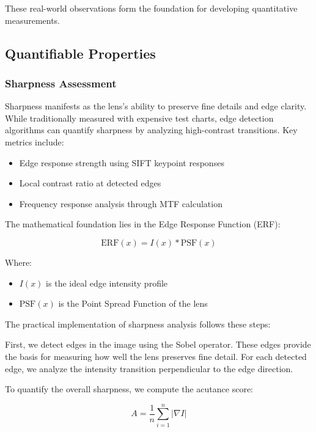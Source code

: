 These real-world observations form the foundation for developing quantitative measurements.

\subsection{Quantifiable Properties}

\subsubsection{Sharpness Assessment}
Sharpness manifests as the lens's ability to preserve fine details and edge clarity. While traditionally measured with expensive test charts, edge detection algorithms can quantify sharpness by analyzing high-contrast transitions. Key metrics include:

\begin{itemize}
    \item Edge response strength using SIFT keypoint responses
    \item Local contrast ratio at detected edges
    \item Frequency response analysis through MTF calculation
\end{itemize}

The mathematical foundation lies in the Edge Response Function (ERF):

\begin{equation}
\text{ERF}(x) = I(x) * \text{PSF}(x)
\end{equation}

Where:
\begin{itemize}
    \item \( I(x) \) is the ideal edge intensity profile
    \item \( \text{PSF}(x) \) is the Point Spread Function of the lens
\end{itemize}

The practical implementation of sharpness analysis follows these steps:

First, we detect edges in the image using the Sobel operator. These edges provide the basis for measuring how well the lens preserves fine detail. For each detected edge, we analyze the intensity transition perpendicular to the edge direction.

To quantify the overall sharpness, we compute the acutance score:

\begin{equation}
A = \frac{1}{n} \sum_{i=1}^{n} |\nabla I|
\end{equation}

